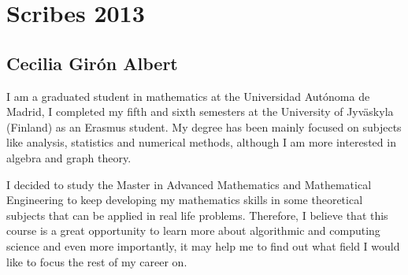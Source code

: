 \chapter*{Scribes 2013}

\section{Cecilia Girón Albert}

I am a graduated student in mathematics at the Universidad Autónoma de Madrid, I completed my fifth and sixth semesters at the University of Jyväskyla (Finland) as an Erasmus student. My degree has been mainly focused on subjects like analysis, statistics and numerical methods, although I am more interested in algebra and graph theory. 

I decided to study the Master in Advanced Mathematics and Mathematical Engineering to keep developing my mathematics skills in some theoretical subjects that can be applied in real life problems. Therefore, I believe that this course is a great opportunity to learn more about algorithmic and computing science and even more importantly, it may help me to find out what field I would like to focus the rest of my career on. 



